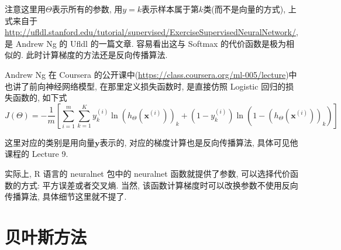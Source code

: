 \documentclass[a4paper,UTF8]{ctexart}
\theoremstyle{plain} \newtheorem{theorem}{定理}[section]
\theoremstyle{plain} \newtheorem{definition}{定义}[section]
\theoremstyle{plain} \newtheorem{lemma}{引理}[section]
\theoremstyle{plain} \newtheorem{proposition}{命题}[section]
\theoremstyle{plain} \newtheorem{example}{例}[section]
\theoremstyle{plain} \newtheorem{remark}{注}[section]
\theoremstyle{plain} \newtheorem{corollary}{推论}[section]
\begin{document}
注意这里用$\Theta$表示所有的参数, 用$y = k$表示样本属于第$k$类(而不是向量的方式), 上式来自于 \url{http://ufldl.stanford.edu/tutorial/supervised/ExerciseSupervisedNeuralNetwork/}, 是 Andrew Ng 的 Ufldl 的一篇文章. 容易看出这与 Softmax 的代价函数是极为相似的. 此时计算梯度的方法还是反向传播算法.

Andrew Ng 在 Coursera 的公开课中(\url{https://class.coursera.org/ml-005/lecture})中也讲了前向神经网络模型, 在那里定义损失函数时, 是直接仿照 Logistic 回归的损失函数的, 如下式
\begin{equation*}
J(\Theta) = - \frac{1}{m} \left[ \sum_{i=1}^{m} \sum_{k=1}^{K} y_{k}^{(i)} \ln (h_{\Theta}(\bm{x}^{(i)}))_{k} + (1 - y_{k}^{(i)}) \ln (1 - (h_{\Theta}(\bm{x}^{(i)}))_{k}) \right]
\end{equation*}

这里对应的类别是用向量$\bm{y}$表示的, 对应的梯度计算也是反向传播算法, 具体可见他课程的 Lecture 9.

实际上, R 语言的 neuralnet 包中的 neuralnet 函数就提供了参数, 可以选择代价函数的方式: 平方误差或者交叉熵. 当然, 该函数计算梯度时可以改换参数不使用反向传播算法, 具体细节这里就不提了.





\section{贝叶斯方法}
\end{document}
